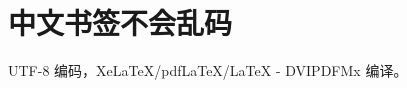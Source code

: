 \documentclass[12pt]{article}
\begin{document}
    \tableofcontents
    \listoftables
    \listoffigures

    \section{中文书签不会乱码}
    UTF-8 编码，Xe\LaTeX{}/pdf\LaTeX{}/\LaTeX{} - DVIPDFMx 编译。
\end{document}
